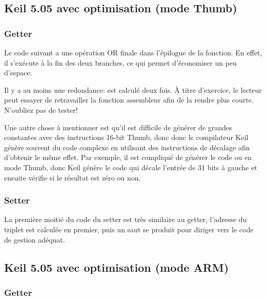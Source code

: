 \subsection{Keil 5.05 avec optimisation (mode Thumb)}

\subsubsection{Getter}

Le code suivant a une opération OR finale dans l'épilogue de la fonction.
En effet, il s'exécute à la fin des deux branches, ce qui permet d'économiser un
peu d'espace.



Il y a au moins une redondance:  est calculé deux fois.
À titre d'exercice, le lecteur peut essayer de retravailler la fonction assembleur
afin de la rendre plus courte. N'oubliez pas de tester!

Une autre chose à mentionner est qu'il est difficile de générer de grandes constantes
avec des instructions 16-bit Thumb, donc donc le compilateur Keil génère souvent
du code complexe en utilisant des instructions de décalage afin d'obtenir le même
effet.
Par exemple, il est compliqué de générer le code  ou 
en mode Thumb, donc Keil génère le code  qui décale l'entrée de 31 bits à
gauche et ensuite vérifie si le résultat est zéro ou non.

\subsubsection{Setter}

La première moitié du code du setter est très similaire au getter, l'adresse du triplet
est calculée en premier, puis un saut se produit pour diriger vers le code de gestion
adéquat.



\subsection{Keil 5.05 avec optimisation (mode ARM)}

\subsubsection{Getter}

